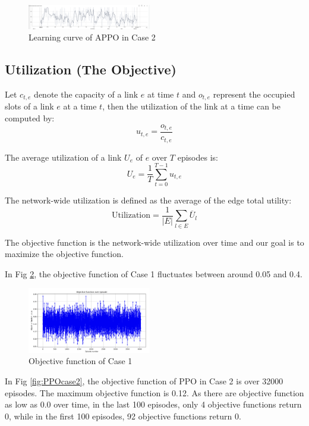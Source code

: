 \documentclass[conference]{IEEEtran}
\begin{document}
\begin{figure}[h]
    \includegraphics[width=0.48\textwidth]{appo_reward_mean.png}
    \caption{Learning curve of APPO in Case 2}
    \label{fig:APPOreward}
\end{figure}

\subsection{Utilization (The Objective)}
\label{sec:util}

Let \(c_{t,e}\) denote the capacity of a link \( e\) at time \( t\) and \(o_{t,e}\) represent the occupied slots of a link \(e\) at a time \( t \), then the utilization  of the link  at a time  can be computed by:
\[
u_{t,e} = \frac{o_{t,e}}{c_{t,e}}
\]

The average utilization of a link \( U_{e} \) of \(e\) over \(T\) episodes is:
\[
 U_{e} = \frac{1}{T} \sum_{t=0}^{T-1} u_{t,e}
\]

The network-wide utilization is defined as the average of the edge total utility:
\[
\text{Utilization} = \frac{1}{|E|} \sum_{l \in E} \overline{U}_l
\]

The objective function is the network-wide utilization over time and our goal is to maximize the objective function.


In Fig \ref{fig:case1}, the objective function of Case 1 fluctuates between around 0.05 and 0.4.

\begin{figure}[h]
    \includegraphics[width=0.48\textwidth]{case1.png}
    \caption{Objective function of Case 1}
    \label{fig:case1}
\end{figure}

In Fig \ref{fig:PPOcase2}, the objective function of PPO in Case 2 is over 32000 episodes. The maximum objective function is 0.12. As there are objective function as low as 0.0 over time, in the last 100 episodes, only 4 objective functions return 0, while in the first 100 episodes, 92 objective functions return 0. 
\end{document}
